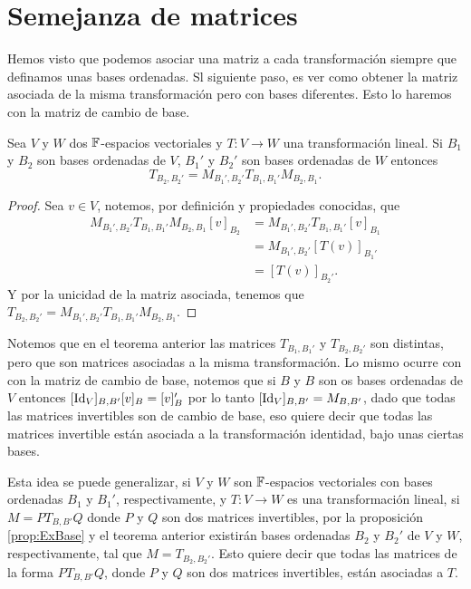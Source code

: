 \section{Semejanza de matrices}

Hemos visto que podemos asociar una matriz a cada transformación siempre que definamos unas bases ordenadas. Sl siguiente paso, es ver como obtener la matriz asociada de la misma transformación pero con bases diferentes. Esto lo haremos con la matriz de cambio de base.

\begin{teor}
  Sea $V$ y $W$ dos $\mathbb{F}$-espacios vectoriales y $T \colon V \to W$ una transformación lineal. Si $B_1$ y $B_2$ son bases ordenadas de $V$, $B_1'$ y $B_2'$ son bases ordenadas de $W$ entonces
  \[T_{B_2,B_2'} = M_{B_1', B_2'} T_{B_1,B_1'}M_{B_2,B_1}. \]
\end{teor}
\begin{proof}
  Sea $v \in V$, notemos, por definición y propiedades conocidas, que
  \begin{align*}
    M_{B_1', B_2'} T_{B_1,B_1'}M_{B_2,B_1} [v]_{B_2} &= M_{B_1', B_2'} T_{B_1,B_1'} [v]_{B_1} \\
      &= M_{B_1', B_2'} [T(v)]_{B_1'} \\
      &= [T(v)]_{B_2'}.
  \end{align*}
  Y por la unicidad de la matriz asociada, tenemos que $T_{B_2,B_2'} = M_{B_1', B_2'} T_{B_1,B_1'}M_{B_2,B_1}$.
\end{proof}

Notemos que en el teorema anterior las matrices $T_{B_1,B_1'}$ y $T_{B_2,B_2'}$ son distintas, pero que son matrices asociadas a la misma transformación. Lo mismo ocurre con con la matriz de cambio de base, notemos que si $B$ y $B$ son os bases ordenadas de $V$ entonces $[\mathrm{Id}_V]_{B,B'}[v]_B = [v]_B'$ por lo tanto $[\mathrm{Id}_V]_{B,B'} = M_{B,B'}$, dado que todas las matrices invertibles son de cambio de base, eso quiere decir que todas las matrices invertible están asociada a la transformación identidad, bajo unas ciertas bases.

Esta idea se puede generalizar, si $V$ y $W$ son $\mathbb{F}$-espacios vectoriales con bases ordenadas $B_1$ y $B_1'$, respectivamente, y $T\colon V \to W$ es una transformación lineal, si $M = PT_{B,B'}Q$ donde $P$ y $Q$ son dos matrices invertibles, por la proposición \ref{prop:ExBase} y el teorema anterior existirán bases ordenadas $B_2$ y $B_2'$ de $V$ y $W$, respectivamente, tal que $M = T_{B_2, B_2'}$. Esto quiere decir que todas las matrices de la forma $PT_{B,B'}Q$, donde $P$ y $Q$ son dos matrices invertibles, están asociadas a $T$.

